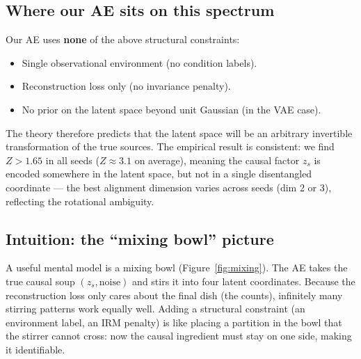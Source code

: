 \documentclass[11pt,a4paper]{article}
\theoremstyle{definition}
\begin{document}
\subsection{Where our AE sits on this spectrum}

Our AE uses \textbf{none} of the above structural constraints:
\begin{itemize}
  \item Single observational environment (no condition labels).
  \item Reconstruction loss only (no invariance penalty).
  \item No prior on the latent space beyond unit Gaussian (in the VAE case).
\end{itemize}

The theory therefore predicts that the latent space will be an arbitrary
invertible transformation of the true sources.  The empirical result is
consistent: we find $Z > 1.65$ in all seeds ($Z \approx 3.1$ on average),
meaning the causal factor $z_s$ is encoded somewhere in the latent space,
but not in a single disentangled coordinate --- the best alignment
dimension varies across seeds (dim 2 or 3), reflecting the rotational
ambiguity.

\subsection{Intuition: the ``mixing bowl'' picture}

A useful mental model is a mixing bowl (Figure~\ref{fig:mixing}).
The AE takes the true causal soup $(z_s, \text{noise})$ and stirs it
into four latent coordinates.  Because the reconstruction loss only
cares about the final dish (the counts), infinitely many stirring
patterns work equally well.  Adding a structural constraint (an
environment label, an IRM penalty) is like placing a partition in the
bowl that the stirrer cannot cross: now the causal ingredient must stay
on one side, making it identifiable.
\end{document}
